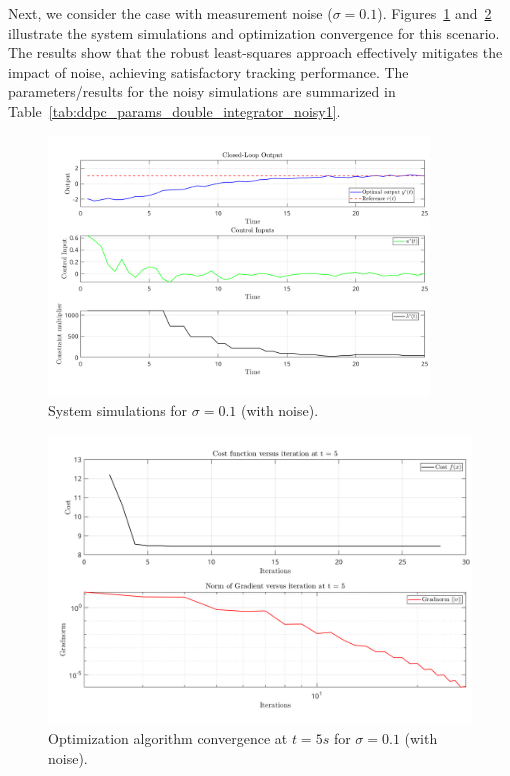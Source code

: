 Next, we consider the case with measurement noise ($\sigma = 0.1$). Figures~\ref{fig:ddpc_noisy1} and~\ref{fig:conv_noisy1} illustrate the system simulations and optimization convergence for this scenario. The results show that the robust least-squares approach effectively mitigates the impact of noise, achieving satisfactory tracking performance. The parameters/results for the noisy simulations are summarized in Table~\ref{tab:ddpc_params_double_integrator_noisy1}.
\begin{figure}[h!]
    \centering
    \includegraphics[trim={0cm 1cm 0cm 0cm},clip,width=0.9\textwidth]{figures/closed_loop_snr_0p1_gamma_4_rho_1.png}
    \caption{System simulations for $\sigma = 0.1$ (with noise).}
    \label{fig:ddpc_noisy1}
\end{figure}

\begin{figure}[h]
    \centering
    \includegraphics[width=\textwidth]{figures/cost_gradnorm_snr_0p1_gamma_4_rho_1.png}
    \caption{Optimization algorithm convergence at $t=5s$ for $\sigma = 0.1$ (with noise).}
    \label{fig:conv_noisy1}
\end{figure}

